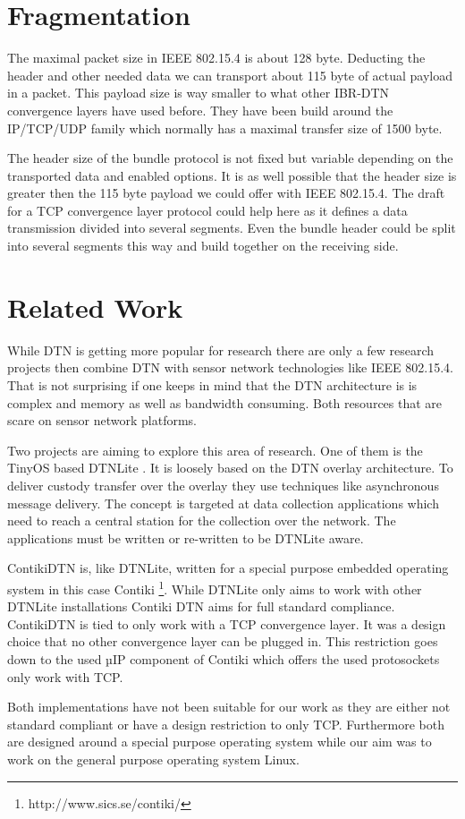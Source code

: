 \section{Fragmentation}

The maximal packet size in IEEE 802.15.4 is about 128 byte. Deducting the header
and other needed data we can transport about 115 byte of actual payload in a
packet. This payload size is way smaller to what other IBR-DTN convergence
layers have used before. They have been build around the IP/TCP/UDP family which
normally has a maximal transfer size of 1500 byte.

The header size of the bundle protocol is not fixed but variable depending on
the transported data and enabled options. It is as well possible that the header
size is greater then the 115 byte payload we could offer with IEEE 802.15.4. The
draft \cite{tcp-clayer-draft} for a TCP convergence layer protocol could help here as it
defines a data transmission divided into several segments. Even the bundle
header could be split into several segments this way and build together on the
receiving side.

\section{Related Work}
\label{relatedwork}

While DTN is getting more popular for research there are only a few research
projects then combine DTN with sensor network technologies like IEEE 802.15.4.
That is not surprising if one keeps in mind that the DTN architecture is is
complex and memory as well as bandwidth consuming. Both resources that are scare
on sensor network platforms.

Two projects are aiming to explore this area of research. One of them is the
TinyOS based DTNLite \cite{dtnlite}. It is loosely based on the DTN overlay
architecture. To deliver custody transfer over the overlay they use techniques
like asynchronous message delivery. The concept is targeted at data collection
applications which need to reach a central station for the collection over the
network. The applications must be written or re-written to be DTNLite aware.

ContikiDTN \cite{contikidtn} is, like DTNLite, written for a special purpose
embedded operating system in this case Contiki
\footnote{http://www.sics.se/contiki/}. While DTNLite only aims to work with
other DTNLite installations Contiki DTN aims for full standard compliance.
ContikiDTN is tied to only work with a TCP convergence layer. It was a design
choice that no other convergence layer can be plugged in. This restriction goes
down to the used µIP component of Contiki which offers the used protosockets
only work with TCP.

Both implementations have not been suitable for our work as they are either not
standard compliant or have a design restriction to only TCP. Furthermore both
are designed around a special purpose operating system while our aim was to work
on the general purpose operating system Linux.
